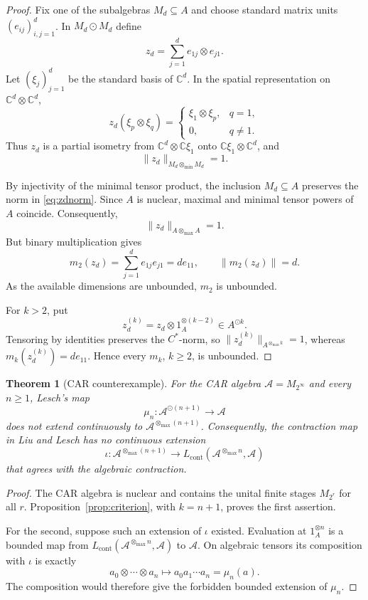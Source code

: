 \documentclass[11pt]{article}
\newtheorem{theorem}{Theorem}
\newcommand{\A}{\mathcal A}
\newcommand{\M}{M}
\newcommand{\C}{\mathbb C}
\newcommand{\od}{\mathbin{\odot}}
\newcommand{\tmax}{\otimes_{\max}}
\newcommand{\tmin}{\otimes_{\min}}
\begin{document}
\begin{proof}
Fix one of the subalgebras $\M_d\subseteq A$ and choose standard matrix units
$(e_{ij})_{i,j=1}^d$.  In $\M_d\od\M_d$ define
\[
 z_d=\sum_{j=1}^d e_{1j}\otimes e_{j1}.
\]
Let $(\xi_j)_{j=1}^d$ be the standard basis of $\C^d$.  In the spatial
representation on $\C^d\otimes\C^d$,
\[
 z_d(\xi_p\otimes\xi_q)
 =\begin{cases}
    \xi_1\otimes\xi_p,&q=1,\\
    0,&q\ne1.
  \end{cases}
\]
Thus $z_d$ is a partial isometry from
$\C^d\otimes\C\xi_1$ onto $\C\xi_1\otimes\C^d$, and
\begin{equation}\label{eq:zdnorm}
 \|z_d\|_{\M_d\tmin\M_d}=1.
\end{equation}

By injectivity of the minimal tensor product, the inclusion
$\M_d\subseteq A$ preserves the norm in \eqref{eq:zdnorm}.  Since $A$ is
nuclear, maximal and minimal tensor powers of $A$ coincide.  Consequently,
\[
 \|z_d\|_{A\tmax A}=1.
\]
But binary multiplication gives
\begin{equation}\label{eq:blowup}
 m_2(z_d)=\sum_{j=1}^d e_{1j}e_{j1}=d e_{11},
 \qquad \|m_2(z_d)\|=d.
\end{equation}
As the available dimensions are unbounded, $m_2$ is unbounded.

For $k>2$, put
\[
 z_d^{(k)}=z_d\otimes 1_A^{\otimes(k-2)}\in A^{\od k}.
\]
Tensoring by identities preserves the $C^*$-norm, so
$\|z_d^{(k)}\|_{A^{\tmax k}}=1$, whereas
$m_k(z_d^{(k)})=d e_{11}$.  Hence every $m_k$, $k\ge2$, is unbounded.
\end{proof}

\begin{theorem}[CAR counterexample]\label{thm:main}
For the CAR algebra $\A=\M_{2^\infty}$ and every $n\ge1$, Lesch's map
\[
 \mu_n:\A^{\od(n+1)}\longrightarrow\A
\]
does not extend continuously to $\A^{\tmax(n+1)}$.  Consequently, the
contraction map in Liu and Lesch has no continuous extension
\[
 \iota:\A^{\tmax(n+1)}\longrightarrow
 L_{\mathrm{cont}}(\A^{\tmax n},\A)
\]
that agrees with the algebraic contraction.
\end{theorem}

\begin{proof}
The CAR algebra is nuclear and contains the unital finite stages
$\M_{2^r}$ for all $r$.  Proposition~\ref{prop:criterion}, with
$k=n+1$, proves the first assertion.

For the second, suppose such an extension of $\iota$ existed.  Evaluation at
$1_A^{\otimes n}$ is a bounded map from
$L_{\mathrm{cont}}(\A^{\tmax n},\A)$ to $\A$.  On algebraic tensors its
composition with $\iota$ is exactly
\[
 a_0\otimes\cdots\otimes a_n\longmapsto a_0a_1\cdots a_n=\mu_n(a).
\]
The composition would therefore give the forbidden bounded extension of
$\mu_n$.
\end{proof}
\end{document}
